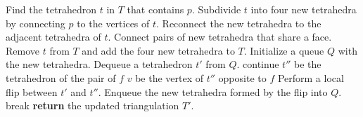 \documentclass{article}
\begin{document}
\begin{algorithm}
\caption{Insertion of a Point into a Delaunay Triangulation \\\hspace*{1em}\textbf{Input:} A current Delaunay triangulation $T$ of a point set $P$ in $\mathbb{R}^3$, and a new point $p$ to be inserted.\\\hspace*{1em}\textbf{Output:} An updated Delaunay triangulation $T'$ that includes the new point $p$.}
\label{alg:insert_point_delaunay}
\begin{algorithmic}[1]
    
        \State Find the tetrahedron $t$ in $T$ that contains $p$.
        \State Subdivide $t$ into four new tetrahedra by connecting $p$ to the vertices of $t$.
        \State Reconnect the new tetrahedra to the adjacent tetrahedra of $t$.
        \State Connect pairs of new tetrahedra that share a face.
        \State Remove $t$ from $T$ and add the four new tetrahedra to $T$.
        \State Initialize a queue $Q$ with the new tetrahedra.
            \State Dequeue a tetrahedron $t'$ from $Q$.
                \State continue
            \EndIf
                    \Let $t''$ be the tetrahedron of the pair of $f$
                    \Let $v$ be the vertex of $t''$ opposite to $f$
                        \State Perform a local flip between $t'$ and $t''$.
                        \State Enqueue the new tetrahedra formed by the flip into $Q$.
                        \State break
                    \EndIf
                \EndIf
            \EndFor
        \EndWhile
        \State \textbf{return} the updated triangulation $T'$.
    \EndProcedure
\end{algorithmic}
\end{algorithm}
\end{document}
